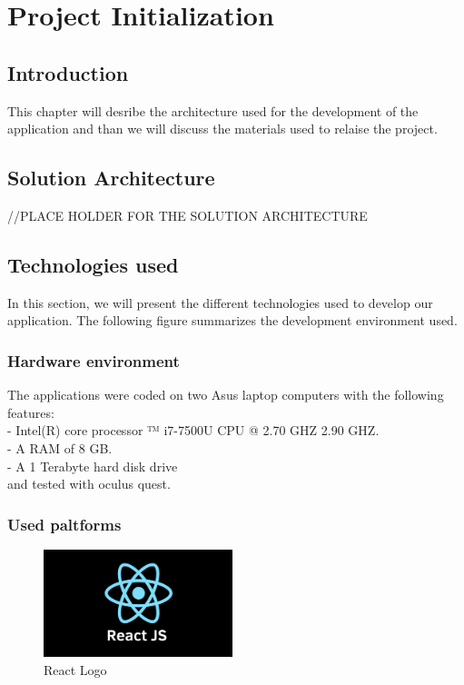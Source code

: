 \documentclass[]{report}
\begin{document}
\chapter{Project Initialization}
\section{Introduction}
This chapter will desribe the architecture used for the development of the application and than we will discuss the materials used to relaise the project.

\section{Solution Architecture}
//PLACE HOLDER FOR THE SOLUTION ARCHITECTURE


\section{Technologies used}
In this section, we will present the different technologies used to develop our application. The following figure summarizes the development environment used.
\subsection{Hardware environment}
The applications were coded on two Asus laptop computers with the following features:\\
{\indent - Intel(R) core processor ™ i7-7500U CPU @ 2.70 GHZ 2.90 GHZ.}\\
\indent - A RAM of 8 GB.\\
\indent - A 1 Terabyte hard disk drive\\
and tested with oculus quest.
\subsection{Used paltforms}



\begin{figure}
	
	\includegraphics[width=5.5cm]{React}
	\caption{React Logo}
\end{figure}
\end{document}
